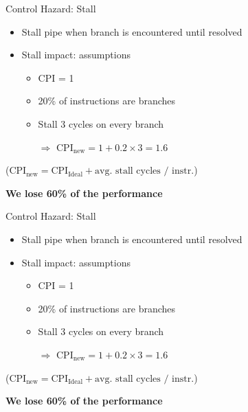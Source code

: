 \documentclass[aspectratio=169,12pt]{beamer}
\begin{document}
\begin{frame}{Control Hazard: Stall}
    \begin{itemize}
        \item Stall pipe when branch is encountered until resolved
        \item Stall impact: assumptions
        \begin{itemize}
            \item CPI = 1
            \item 20\% of instructions are branches
            \item Stall 3 cycles on every branch
            \item[$\Rightarrow$] $\text{CPI}_{\text{new}} = 1 + 0.2 \times 3 = 1.6$
        \end{itemize}
    \end{itemize}
    
    \vspace{0.5cm}
    \centering
    ($\text{CPI}_{\text{new}} = \text{CPI}_{\text{Ideal}} + \text{avg. stall cycles / instr.}$)
    
    \vspace{0.5cm}
    \textbf{We lose 60\% of the performance}
\end{frame}

\begin{frame}{Control Hazard: Stall}
    \begin{itemize}
        \item Stall pipe when branch is encountered until resolved
        \item Stall impact: assumptions
        \begin{itemize}
            \item CPI = 1
            \item 20\% of instructions are branches
            \item Stall 3 cycles on every branch
            \item[$\Rightarrow$] $\text{CPI}_{\text{new}} = 1 + 0.2 \times 3 = 1.6$
        \end{itemize}
    \end{itemize}
    
    \vspace{0.5cm}
    \centering
    ($\text{CPI}_{\text{new}} = \text{CPI}_{\text{Ideal}} + \text{avg. stall cycles / instr.}$)
    
    \vspace{0.5cm}
    \textbf{We lose 60\% of the performance}
\end{frame}
\end{document}
